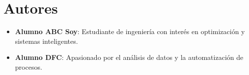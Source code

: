 \section*{Autores}
\begin{itemize}
  \item \textbf{Alumno ABC Soy}: Estudiante de ingeniería con interés en optimización y sistemas inteligentes.
  \item \textbf{Alumno DFC}: Apasionado por el análisis de datos y la automatización de procesos.
\end{itemize}
